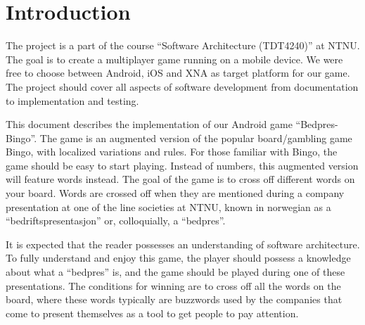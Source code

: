 \section{Introduction}
\label{sec:introduction}

The project is a part of the course ``Software Architecture (TDT4240)'' at NTNU. The goal is to create a multiplayer game running on a mobile device. We were free to choose between Android, iOS and XNA as target platform for our game. 
The project should cover all aspects of software development from documentation to implementation and testing. 

This document describes the implementation of our Android game ``Bedpres-Bingo''.
The game is an augmented version of the popular board/gambling game Bingo,
with localized variations and rules. For those familiar with Bingo,
the game should be easy to start playing. Instead of numbers, this augmented
version will feature words instead. The goal of the game is to cross off
different words on your board. Words are crossed off when they are mentioned
during a company presentation at one of the line societies at NTNU, known in
norwegian as a ``bedriftspresentasjon'' or, colloquially, a ``bedpres''.

It is expected that the reader possesses an understanding of software
architecture. To fully understand and enjoy this game, the player should
possess a knowledge about what a ``bedpres'' is, and the game should be played
during one of these presentations. The conditions for winning are to cross off
all the words on the board, where these words typically are buzzwords used by
the companies that come to present themselves as a tool to get people to pay
attention.
